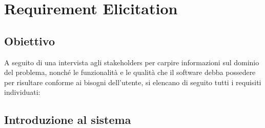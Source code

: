 
\chapter{Requirement Elicitation}
    \section{Obiettivo}
        A seguito di una intervista agli stakeholders per carpire informazioni sul dominio del problema, nonché le funzionalità e le qualità che il software debba possedere per risultare conforme ai bisogni dell'utente, si elencano di seguito tutti i requisiti individuati:
    \section{Introduzione al sistema} %
